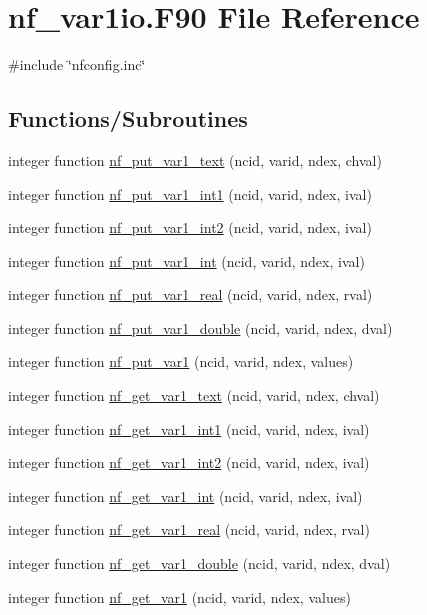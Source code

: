 \hypertarget{nf__var1io_8F90}{}\section{nf\+\_\+var1io.\+F90 File Reference}
\label{nf__var1io_8F90}
{\ttfamily \#include \char`\"{}nfconfig.\+inc\char`\"{}}\newline
\subsection*{Functions/\+Subroutines}
\begin{DoxyCompactItemize}
\item 
integer function \hyperlink{nf__var1io_8F90_ab62d8766bbb405b35c7a6bb2fc3aaf35}{nf\+\_\+put\+\_\+var1\+\_\+text} (ncid, varid, ndex, chval)
\item 
integer function \hyperlink{nf__var1io_8F90_a69f0bec37e3970b10e72933863985359}{nf\+\_\+put\+\_\+var1\+\_\+int1} (ncid, varid, ndex, ival)
\item 
integer function \hyperlink{nf__var1io_8F90_a06f89d6209e9922c1141482e2777b04c}{nf\+\_\+put\+\_\+var1\+\_\+int2} (ncid, varid, ndex, ival)
\item 
integer function \hyperlink{nf__var1io_8F90_a890965428535128437db4d62fc6c0a88}{nf\+\_\+put\+\_\+var1\+\_\+int} (ncid, varid, ndex, ival)
\item 
integer function \hyperlink{nf__var1io_8F90_a93ed859f7cafc1f17e0c3d02aeb25ccf}{nf\+\_\+put\+\_\+var1\+\_\+real} (ncid, varid, ndex, rval)
\item 
integer function \hyperlink{nf__var1io_8F90_a5046421bf98dd86b2ec141c9fe6ef129}{nf\+\_\+put\+\_\+var1\+\_\+double} (ncid, varid, ndex, dval)
\item 
integer function \hyperlink{nf__var1io_8F90_a9ddfd74a7307054bff4eb442de94e43e}{nf\+\_\+put\+\_\+var1} (ncid, varid, ndex, values)
\item 
integer function \hyperlink{nf__var1io_8F90_a8f940e36d194bd3eec9616d971a19294}{nf\+\_\+get\+\_\+var1\+\_\+text} (ncid, varid, ndex, chval)
\item 
integer function \hyperlink{nf__var1io_8F90_a0fc2a64f64269d7a6ab53bc9ced96dfd}{nf\+\_\+get\+\_\+var1\+\_\+int1} (ncid, varid, ndex, ival)
\item 
integer function \hyperlink{nf__var1io_8F90_acfa166871d98cc290adbac15bf423f97}{nf\+\_\+get\+\_\+var1\+\_\+int2} (ncid, varid, ndex, ival)
\item 
integer function \hyperlink{nf__var1io_8F90_a92c438f1cc42f38d3c66f6342d884b8d}{nf\+\_\+get\+\_\+var1\+\_\+int} (ncid, varid, ndex, ival)
\item 
integer function \hyperlink{nf__var1io_8F90_a11ea86469a0286640b081b250dba66e4}{nf\+\_\+get\+\_\+var1\+\_\+real} (ncid, varid, ndex, rval)
\item 
integer function \hyperlink{nf__var1io_8F90_a517f82bf8478607ab1d561aa704fd770}{nf\+\_\+get\+\_\+var1\+\_\+double} (ncid, varid, ndex, dval)
\item 
integer function \hyperlink{nf__var1io_8F90_aa054a511ec22cb03251956807ceef553}{nf\+\_\+get\+\_\+var1} (ncid, varid, ndex, values)
\end{DoxyCompactItemize}


